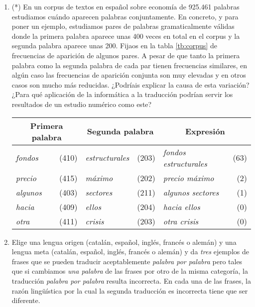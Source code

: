 \begin{enumerate}
\item (*) En un corpus de textos en español sobre economía de 925.461 palabras estudiamos cuándo aparecen palabras conjuntamente. En concreto, y para poner un ejemplo, estudiamos pares de palabras gramaticalmente válidas donde la primera palabra aparece unas 400 veces en total en el corpus y la segunda palabra  aparece unas 200. Fijaos en la tabla \ref{tb:corpus} de frecuencias de aparición de algunos pares. A pesar de que tanto la primera palabra como la segunda palabra de cada par tienen frecuencias similares, en algún caso las frecuencias de aparición conjunta son muy elevadas y en otros casos son mucho más reducidas. ¿Podríais explicar la causa de esta variación? ¿Para qué aplicación de la informática a la traducción podrían servir los resultados de un estudio numérico como este? \begin{table*} \begin{center} \begin{tabular}{lr|lr|lr} \hline\hline \multicolumn{2}{c|}{\textsf{Primera palabra}} &\multicolumn{2}{c|}{\textsf{Segunda palabra}} &\multicolumn{2}{c}{\textsf{Expresión}} \\ \hline

\emph{fondos} &(410) &\emph{estructurales} &(203) &\emph{fondos estructurales} &(63) \\ \emph{precio} &(415) &\emph{máximo} &(202) &\emph{precio máximo} &(2) \\ \emph{algunos} &(403) &\emph{sectores} &(211) &\emph{algunos sectores} &(1) \\ \emph{hacia} &(409) &\emph{ellos} &(204) &\emph{hacia ellos} &(0) \\ \emph{otra} &(411) &\emph{crisis} &(203) &\emph{otra crisis} &(0) \\ \hline

\end{tabular} \end{center} \caption{Frecuencias de aparición de pares de palabras sobre economía.} \label{tb:corpus} \end{table*} 

\item Elige una lengua origen (catalán, español, inglés, francés o alemán) y una lengua meta (catalán, español, inglés, francés o alemán) y da \emph{tres} ejemplos de frases que se pueden traducir aceptablemente \emph{palabra por palabra} pero tales que si cambiamos \emph{una palabra} de las frases por otro de la misma categoría, la traducción \emph{palabra por palabra} resulta incorrecta. En cada una de las frases, la razón lingüística por la cual la segunda traducción es incorrecta tiene que ser diferente. 


\end{enumerate}
